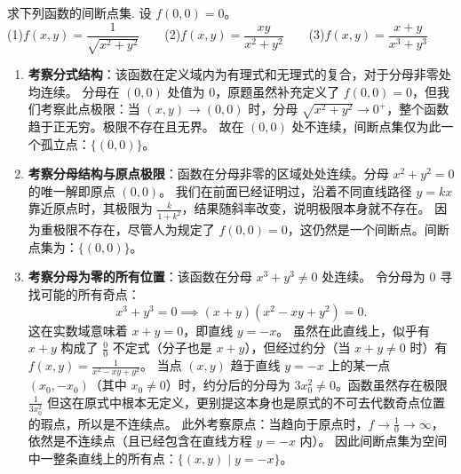 \documentclass[lang=cn,11pt]{elegantbook}
\begin{document}
\begin{exercise}[求间断点集]
求下列函数的间断点集. 设 $f(0,0)=0$。\\
(1)$f(x,y) = \dfrac{1}{\sqrt{x^2+y^2}}$~~~~(2)$f(x,y) = \dfrac{xy}{x^2+y^2}$~~~~(3)$f(x,y) = \dfrac{x+y}{x^3+y^3}$
\end{exercise}
\begin{solution}
\begin{enumerate}
  \item[(1)] \textbf{考察分式结构}：该函数在定义域内为有理式和无理式的复合，对于分母非零处均连续。
  分母在 $(0,0)$ 处值为 0，原题虽然补充定义了 $f(0,0)=0$，但我们考察此点极限：当 $(x,y) \to (0,0)$ 时，分母 $\sqrt{x^2+y^2} \to 0^+$，整个函数趋于正无穷。极限不存在且无界。
  故在 $(0,0)$ 处不连续，间断点集仅为此一个孤立点：$\{(0,0)\}$。
  \item[(2)] \textbf{考察分母结构与原点极限}：函数在分母非零的区域处处连续。分母 $x^2+y^2=0$ 的唯一解即原点 $(0,0)$。
  我们在前面已经证明过，沿着不同直线路径 $y=kx$ 靠近原点时，其极限为 $\frac{k}{1+k^2}$，结果随斜率改变，说明极限本身就不存在。
  因为重极限不存在，尽管人为规定了 $f(0,0)=0$，这仍然是一个间断点。间断点集为：$\{(0,0)\}$。
  \item[(3)] \textbf{考察分母为零的所有位置}：该函数在分母 $x^3+y^3 \neq 0$ 处连续。
  令分母为 0 寻找可能的所有奇点：
  \[
  x^3+y^3 = 0 \implies (x+y)(x^2-xy+y^2) = 0.
  \]
  这在实数域意味着 $x+y=0$，即直线 $y=-x$。
  虽然在此直线上，似乎有 $x+y$ 构成了 $\frac{0}{0}$ 不定式（分子也是 $x+y$），但经过约分（当 $x+y \neq 0$ 时）有 $f(x,y) = \frac{1}{x^2-xy+y^2}$。
  当点 $(x,y)$ 趋于直线 $y=-x$ 上的某一点 $(x_0, -x_0)$（其中 $x_0 \neq 0$）时，约分后的分母为 $3x_0^2 \neq 0$。函数虽然存在极限 $\frac{1}{3x_0^2}$ 但这在原式中根本无定义，更别提这本身也是原式的不可去代数奇点位置的瑕点，所以是不连续点。
  此外考察原点：当趋向于原点时，$f \to \frac{1}{0} \to \infty$，依然是不连续点（且已经包含在直线方程 $y=-x$ 内）。
  因此间断点集为空间中一整条直线上的所有点：$\{(x,y) \mid y = -x\}$。
\end{enumerate}
\end{solution}
\end{document}

